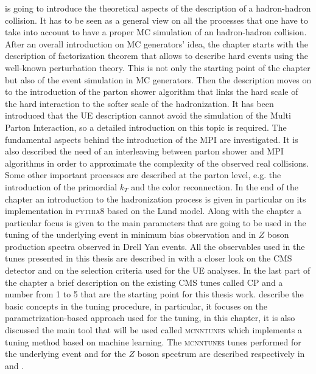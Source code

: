 \medskip

 is going to introduce the theoretical aspects of the description of a hadron-hadron collision. It has to be seen as a general view on all the processes that one have to take into account to have a proper MC simulation of an hadron-hadron collision. After an overall introduction on MC generators' idea, the chapter starts with the description of factorization theorem that allows to describe hard events using the well-known perturbation theory. This is not only the starting point of the chapter but also of the event simulation in MC generators. Then the description moves on to the introduction of the parton shower algorithm that links the hard scale of the hard interaction to the softer scale of the hadronization. It has been introduced that the UE description cannot avoid the simulation of the Multi Parton Interaction, so a detailed introduction on this topic is required. The fundamental aspects behind the introduction of the MPI are investigated. It is also described the need of an interleaving between parton shower and MPI algorithms in order to approximate the complexity of the observed real collisions.  Some other important processes are described at the parton level, e.g. the introduction of the primordial $k_T$ and the color reconnection. In the end of the chapter an introduction to the hadronization process is given in particular on its implementation in \textsc{pythia8} based on the Lund model. 
Along with the chapter a particular focus is given to the main parameters that are going to be used in the tuning of the underlying event in minimum bias observation and in $Z$ boson production spectra observed in Drell Yan events. All the observables used in the tunes presented in this thesis are described in  with a closer look on the CMS detector and on the selection criteria used for the UE analyses. In the last part of the chapter a brief description on the existing CMS tunes called CP and a number from 1 to 5 \cite{CPtunes} that are the starting point for this thesis work.  describe the basic concepts in the tuning procedure, in particular, it focuses on the parametrization-based approach used for the tuning, in this chapter, it is also discussed the main tool that will be used called \textsc{mcnntunes} \cite{MCNNTUNESarticle} which implements a tuning method based on machine learning. The \textsc{mcnntunes} tunes performed for the underlying event and for the $Z$ boson spectrum are described respectively in  and .
 